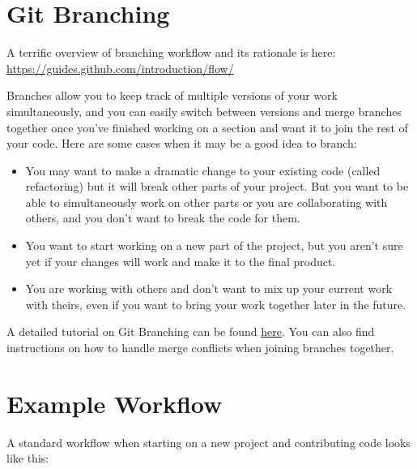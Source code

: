 \documentclass[]{book}
\providecommand{\tightlist}{%
  \setlength{\itemsep}{0pt}\setlength{\parskip}{0pt}}
\begin{document}
\hypertarget{git-branching}{%
\section{Git Branching}\label{git-branching}}

A terrific overview of branching workflow and its rationale is here: \url{https://guides.github.com/introduction/flow/}

Branches allow you to keep track of multiple versions of your work simultaneously, and you can easily switch between versions and merge branches together once you've finished working on a section and want it to join the rest of your code. Here are some cases when it may be a good idea to branch:

\begin{itemize}
\tightlist
\item
  You may want to make a dramatic change to your existing code (called refactoring) but it will break other parts of your project. But you want to be able to simultaneously work on other parts or you are collaborating with others, and you don't want to break the code for them.
\item
  You want to start working on a new part of the project, but you aren't sure yet if your changes will work and make it to the final product.
\item
  You are working with others and don't want to mix up your current work with theirs, even if you want to bring your work together later in the future.
\end{itemize}

A detailed tutorial on Git Branching can be found \href{https://sp19.datastructur.es/materials/guides/using-git\#e-git-branching-advanced-git-optional}{here}. You can also find instructions on how to handle merge conflicts when joining branches together.

\hypertarget{example-workflow}{%
\section{Example Workflow}\label{example-workflow}}

A standard workflow when starting on a new project and contributing code looks like this:
\end{document}
